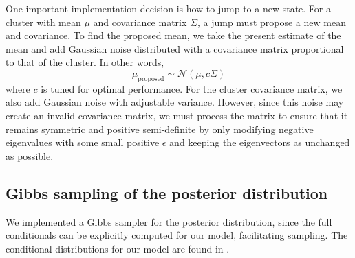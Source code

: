 \documentclass[twoside]{article}
\theoremstyle{theorem}
\theoremstyle{theorem}
\theoremstyle{theorem}
\theoremstyle{lemma}
\theoremstyle{definition}
\theoremstyle{example}
\begin{document}
One important implementation decision is how to jump to a new state. For a cluster with mean $\mu$ and covariance matrix $\Sigma$, a jump must propose a new mean and covariance. To find the proposed mean, we take the present estimate of the mean and add Gaussian noise distributed with a covariance matrix proportional to that of the cluster. In other words,
$$\mu_\text{proposed} \sim \mathcal{N}(\mu, c\Sigma)$$
where $c$ is tuned for optimal performance. For the cluster covariance matrix, we also add Gaussian noise with adjustable variance. However, since this noise may create an invalid covariance matrix, we must process the matrix to ensure that it remains symmetric and positive semi-definite by only modifying negative eigenvalues with some small positive $\epsilon$ and keeping the eigenvectors as unchanged as possible.

\subsection{Gibbs sampling of the posterior distribution}
We implemented a Gibbs sampler for the posterior distribution, since the full conditionals can be explicitly computed for our model, facilitating sampling.  The conditional distributions for our model are found in \cite{Gelman, Jones}. 
\end{document}
